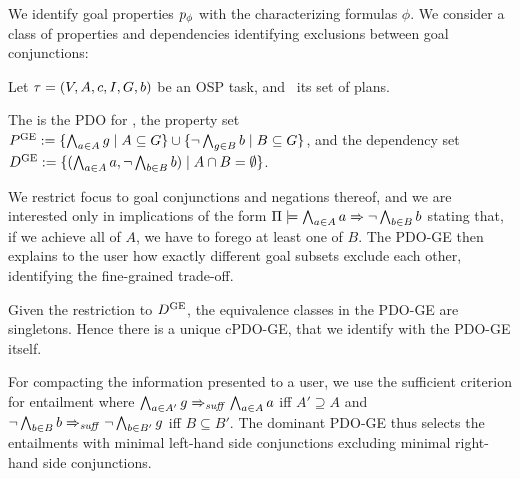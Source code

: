 We identify goal properties $p_\phi$ with the characterizing
formulas $\phi$. We consider a class of properties and dependencies
identifying exclusions between goal conjunctions:

\begin{definition}
Let $\tau =
(V,\allowbreak A,\allowbreak{\ensuremath{c}},\allowbreak I,\allowbreak G,\allowbreak{\ensuremath{b}})$
be an OSP task, and \plans\ its set of plans.  

The  is the PDO for \plans,
the property set ${P^{\text{\textup{GE}}}} := \{\bigwedge_{a \in A}
g\allowbreak\mid\allowbreak A \subseteq G\} \cup \{\neg \bigwedge_{g
  \in B} b \allowbreak\mid\allowbreak B \subseteq G\}$, and the
dependency set ${D^{\text{\textup{GE}}}} := \{(\bigwedge_{a \in A} a,\allowbreak\neg
\bigwedge_{b \in B} b) \allowbreak\mid\allowbreak A \cap B =
\emptyset\}$.
\end{definition}

We restrict focus to goal conjunctions and negations thereof, and we
are interested only in implications of the form
$\Pi \models \bigwedge_{a \in A} a \Rightarrow \neg \bigwedge_{b \in B} b$
stating that, if we achieve all of $A$, we have to forego at least one
of $B$. The PDO-GE then explains to the user how exactly different
goal subsets exclude each other, identifying the fine-grained
trade-off.

Given the restriction to ${D^{\text{\textup{GE}}}}$, the equivalence classes in the
PDO-GE are singletons. Hence there is a unique cPDO-GE, that we
identify with the PDO-GE itself.

For compacting the information presented to a user, we use the
sufficient criterion for entailment where $\bigwedge_{a \in A'} g
\Rightarrow_{\mathit{suff}} \bigwedge_{a \in A} a$ iff $A' \supseteq A$ and $\neg
\bigwedge_{b \in B} b \Rightarrow_{\mathit{suff}} \neg \bigwedge_{b \in B'} g$ iff $B
\subseteq B'$. The dominant PDO-GE thus selects the entailments with
minimal left-hand side conjunctions excluding minimal right-hand side
conjunctions.
%





